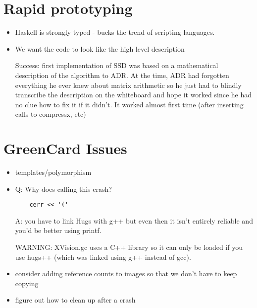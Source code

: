 \section{Rapid prototyping}

\begin{itemize}
\item
Haskell is strongly typed - bucks the trend of scripting languages.

\item
We want the code to look like the high level description

Success: first implementation of SSD was based on a mathematical
description of the algorithm to ADR.  At the time, ADR had forgotten
everything he ever knew about matrix arithmetic so he just had to
blindly transcribe the description on the whiteboard and hope it
worked since he had no clue how to fix it if it didn't.
It worked almost first time (after inserting calls to compressx, etc)

\end{itemize}

\section{GreenCard Issues}

\begin{itemize}
\item
 templates/polymorphism

\item
  Q: Why does calling this crash?
\begin{verbatim}
    cerr << '('
\end{verbatim}
  A: you have to link Hugs with g++ but even then it isn't
  entirely reliable and you'd be better using printf.

  WARNING: XVision.gc uses a C++ library so it can only be loaded
  if you use hugs++ (which was linked using g++ instead
  of gcc).

\item
  consider adding reference counts to images so that we don't
  have to keep copying

\item
 figure out how to clean up after a crash
\end{itemize}



